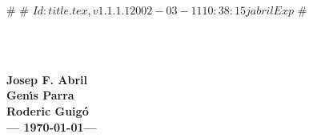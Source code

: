 #
# $Id: title.tex,v 1.1.1.1 2002-03-11 10:38:15 jabril Exp $
#
\pagestyle{empty}

\begin{titlepage}

\ \vfill
\begin{center}
\textbf{\Huge \tit}\\[5ex]

\textbf{\Large Josep F. Abril}\\[1ex]
\textbf{\Large Gen\'{\i}s Parra}\\[1ex]
\textbf{\Large Roderic Guig\'o}\\[5ex] %

\textbf{\large --- \today ---}\\[10ex]

\begin{abstract}
\begin{center}
\parbox{0.75\linewidth}{
\progdesc
} %
\end{center}
\end{abstract}

\vfill

\begin{raggedleft}
\showaffiliation
{}\\
\end{raggedleft}
\end{center}

\end{titlepage} %

\newpage %
